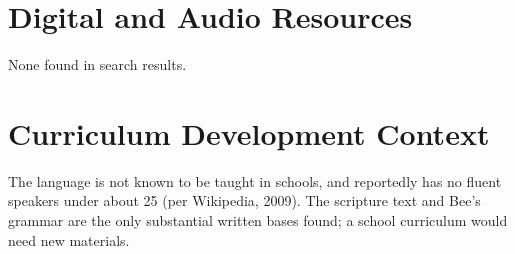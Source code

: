 \documentclass[12pt]{article}
\begin{document}
\section{Digital and Audio Resources}
None found in search results.
\section{Curriculum Development Context}
The language is not known to be taught in schools, and reportedly has no fluent speakers under about 25 (per Wikipedia, 2009). The scripture text and Bee's grammar are the only substantial written bases found; a school curriculum would need new materials.
\end{document}

